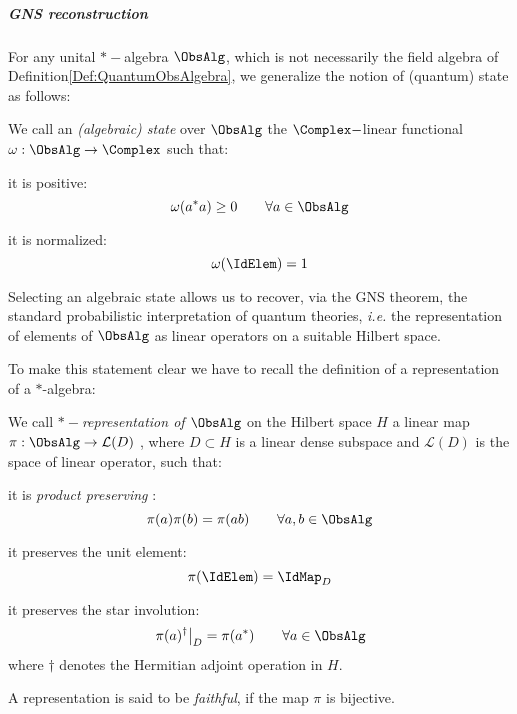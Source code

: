\documentclass[Main]{subfiles}
\begin{document}
			\subparagraph{GNS reconstruction}

				For any unital $\ast-$algebra $\ObsAlg$, which is not necessarily the field algebra of Definition\ref{Def:QuantumObsAlgebra}, we generalize the notion of (quantum) state as follows:
				\begin{definition}
					We call an \emph{(algebraic) state} over $\ObsAlg$ the $\Complex-$linear functional $\omega: \ObsAlg \rightarrow \Complex$ such that:
					\begin{compactitemize}
						\item it is positive:
							$$ \omega( a^* a ) \geq 0 \qquad \forall a \in \ObsAlg$$
						\item it is normalized:
							$$ \omega(\IdElem) = 1 $$
					\end{compactitemize}
				\end{definition}

				Selecting an algebraic state allows us to recover, via the GNS theorem, the standard probabilistic interpretation of quantum theories, \textit{i.e.} the representation of elements of $\ObsAlg$ as linear operators on a suitable Hilbert space.

				To make this statement clear we have to recall the definition of a representation of a $\ast$-algebra:
				\begin{definition}
					We call \emph{$\ast-$representation of $\ObsAlg$} on the Hilbert space $H$ a  linear map $\pi: \ObsAlg \rightarrow \mathcal{L}(D)$ , where $D\subset H$ is a linear dense subspace and $\mathcal{L}(D)$ is the space of linear operator, such that:
					\begin{compactitemize}
						\item it is \emph{product preserving} :
							$$ \pi(a) \pi(b) = \pi ( a b) \qquad \forall a,b \in \ObsAlg$$
						\item it preserves the unit element:
							$$ \pi( \IdElem) = \IdMap_D $$
						\item it preserves the star involution:
							$$ \left. \pi(a)^\dagger \right\vert_D = \pi( a^*) \qquad \forall a \in \ObsAlg$$
								where $\dagger$ denotes the Hermitian adjoint operation in $H$.
					\end{compactitemize}
				\end{definition}
				A representation is said to be \emph{faithful}, if the map $\pi$ is bijective.
\end{document}
